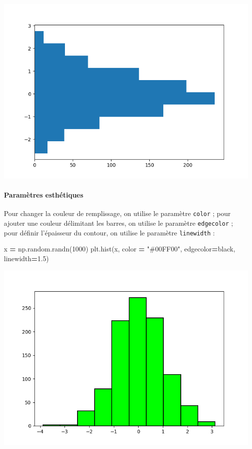 \documentclass[
  12pt,
]{book}
\newenvironment{Shaded}{\begin{snugshade}}{\end{snugshade}}
\newcommand{\DecValTok}[1]{\textcolor[rgb]{0.00,0.00,0.81}{#1}}
\newcommand{\FloatTok}[1]{\textcolor[rgb]{0.00,0.00,0.81}{#1}}
\newcommand{\NormalTok}[1]{#1}
\newcommand{\OperatorTok}[1]{\textcolor[rgb]{0.81,0.36,0.00}{\textbf{#1}}}
\newcommand{\StringTok}[1]{\textcolor[rgb]{0.31,0.60,0.02}{#1}}
\numberwithin{equation}{section}
\numberwithin{countremarque}{section}
\begin{document}
\begin{center}\includegraphics[width=9.03in]{figs/pyplot/histogramme_orientation} \end{center}

\paragraph{Paramètres esthétiques}\label{paramuxe8tres-esthuxe9tiques-1}

Pour changer la couleur de remplissage, on utilise le paramètre \texttt{color} ; pour ajouter une couleur délimitant les barres, on utilise le paramètre \texttt{edgecolor} ; pour définir l'épaisseur du contour, on utilise le paramètre \texttt{linewidth} :

\begin{Shaded}
\begin{Highlighting}[]
\NormalTok{x }\OperatorTok{=}\NormalTok{ np.random.randn(}\DecValTok{1000}\NormalTok{)}
\NormalTok{plt.hist(x, color }\OperatorTok{=} \StringTok{"\#00FF00"}\NormalTok{, edgecolor}\OperatorTok{=}\StringTok{\textquotesingle{}black\textquotesingle{}}\NormalTok{, linewidth}\OperatorTok{=}\FloatTok{1.5}\NormalTok{)}
\end{Highlighting}
\end{Shaded}

\begin{center}\includegraphics[width=9.03in]{figs/pyplot/histogramme_esthetiques} \end{center}
\end{document}

